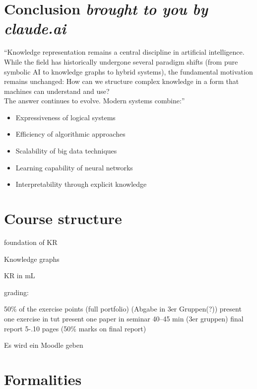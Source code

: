 

\section{Conclusion \textit{brought to you by claude.ai}}
\begin{center}
    ``Knowledge representation remains a central discipline in artificial intelligence. While the field has
    historically undergone several paradigm shifts (from pure symbolic AI to knowledge graphs to hybrid systems),
    the fundamental motivation remains unchanged: How can we structure complex knowledge in a form that machines can
    understand and use?\\
    The answer continues to evolve. Modern systems combine:''
\end{center}
\begin{itemize}
    \item Expressiveness of logical systems

    \item Efficiency of algorithmic approaches

    \item Scalability of big data techniques

    \item Learning capability of neural networks

    \item Interpretability through explicit knowledge

\end{itemize}


\section{Course structure}\label{sec:course-structure}

foundation of KR

Knowledge graphs

KR in mL

grading:

50\% of the exercise points (full portfolio) (Abgabe in 3er Gruppen(?))
present one exercise in tut
present one paper in seminar 40--45 min (3er gruppen)
final report 5-.10 pages (50\% marks on final report)


Es wird ein Moodle geben


\section{Formalities}\label{sec:formalities}